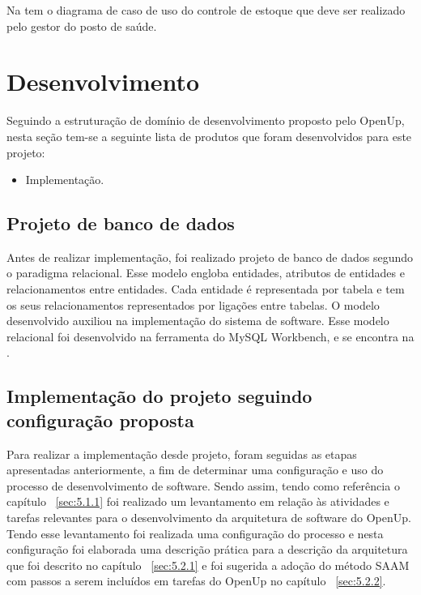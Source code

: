 Na  tem o diagrama de caso de uso do controle de estoque que deve ser realizado pelo gestor do posto de saúde.

%



\section{Desenvolvimento}

Seguindo a estruturação de domínio de desenvolvimento proposto pelo \acrfull{OpenUp}, nesta seção tem-se a seguinte lista de produtos que foram desenvolvidos para este projeto:

\begin{itemize}
    \item Implementação.
  \end{itemize}

\subsection{Projeto de banco de dados}
Antes de realizar implementação, foi realizado projeto de banco de dados segundo o paradigma relacional. Esse modelo engloba entidades, atributos de entidades e relacionamentos entre  entidades. Cada entidade é representada por tabela e tem os seus relacionamentos representados por ligações entre tabelas. O modelo desenvolvido auxiliou na implementação do sistema de software. Esse modelo relacional foi desenvolvido na ferramenta do MySQL Workbench, e se encontra na  .


%


\subsection{Implementação do projeto seguindo configuração proposta}
\label{sec:implementação}
Para realizar a implementação desde projeto, foram seguidas as etapas apresentadas anteriormente, a fim de determinar uma configuração e uso do processo de desenvolvimento de software.
Sendo assim, tendo como referência o capítulo  ~\ref{sec:5.1.1} foi realizado um levantamento em relação às atividades e tarefas relevantes para o desenvolvimento da arquitetura de software do \acrfull{OpenUp}. Tendo esse levantamento foi realizada uma configuração do processo e nesta configuração foi elaborada uma descrição prática para a descrição da arquitetura que foi descrito no capítulo ~\ref{sec:5.2.1} e foi sugerida a adoção do método \acrfull{SAAM} com passos a serem incluídos em tarefas do \acrfull{OpenUp} no capítulo ~\ref{sec:5.2.2}. 

